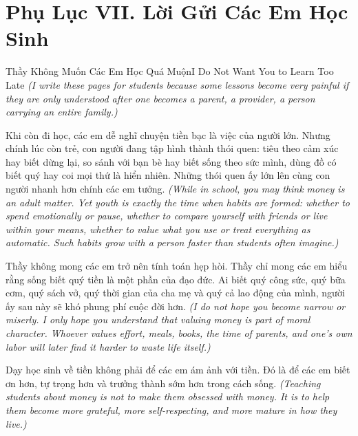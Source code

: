 \chapter*{Phụ Lục VII. Lời Gửi Các Em Học Sinh}

\begin{truyen}{Thầy Không Muốn Các Em Học Quá Muộn}{I Do Not Want You to Learn Too Late}
\textit{(I write these pages for students because some lessons become very painful if they are only understood after one becomes a parent, a provider, a person carrying an entire family.)}

Khi còn đi học, các em dễ nghĩ chuyện tiền bạc là việc của người lớn. Nhưng chính lúc còn trẻ, con người đang tập hình thành thói quen: tiêu theo cảm xúc hay biết dừng lại, so sánh với bạn bè hay biết sống theo sức mình, dùng đồ có biết quý hay coi mọi thứ là hiển nhiên. Những thói quen ấy lớn lên cùng con người nhanh hơn chính các em tưởng.
\textit{(While in school, you may think money is an adult matter. Yet youth is exactly the time when habits are formed: whether to spend emotionally or pause, whether to compare yourself with friends or live within your means, whether to value what you use or treat everything as automatic. Such habits grow with a person faster than students often imagine.)}

Thầy không mong các em trở nên tính toán hẹp hòi. Thầy chỉ mong các em hiểu rằng sống biết quý tiền là một phần của đạo đức. Ai biết quý công sức, quý bữa cơm, quý sách vở, quý thời gian của cha mẹ và quý cả lao động của mình, người ấy sau này sẽ khó phung phí cuộc đời hơn.
\textit{(I do not hope you become narrow or miserly. I only hope you understand that valuing money is part of moral character. Whoever values effort, meals, books, the time of parents, and one’s own labor will later find it harder to waste life itself.)}
\end{truyen}

\begin{baihoc}
Dạy học sinh về tiền không phải để các em ám ảnh với tiền. Đó là để các em biết ơn hơn, tự trọng hơn và trưởng thành sớm hơn trong cách sống.
\textit{(Teaching students about money is not to make them obsessed with money. It is to help them become more grateful, more self-respecting, and more mature in how they live.)}
\end{baihoc}

